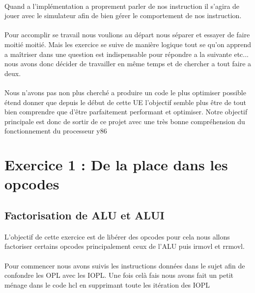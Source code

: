 \documentclass[12pt]{article}
\begin{document}
\paragraph{} Quand a l’implémentation a proprement parler de nos instruction il
s’agira de jouer avec le simulateur afin de bien gérer le comportement de nos instruction.

\paragraph{} Pour accomplir se travail nous voulions au départ nous séparer et essayer de faire moitié moitié. Mais les exercice se suive de manière logique tout se qu'on apprend a maîtriser dans une question est indispensable pour répondre a la suivante etc... nous avons donc décider de travailler en même temps et de chercher a tout faire a deux.

\paragraph{}Nous n'avons pas non plus cherché a produire un code le plus optimiser possible étend donner que depuis le début de cette UE l'objectif semble plus être de tout bien comprendre que d’être parfaitement performant et optimiser. Notre objectif principale est donc de sortir de ce projet avec une très bonne compréhension du fonctionnement du processeur y86

\newpage


\section{Exercice 1 : De la place dans les opcodes}
\subsection{Factorisation de ALU et ALUI}

\paragraph{}L'objectif de cette exercice est de libérer des opcodes pour cela nous allons factoriser certains opcodes principalement ceux de l'ALU puis irmovl et rrmovl.

\paragraph{}Pour commencer nous avons suivis les instructions données dans le sujet afin de confondre les OPL avec les IOPL. Une fois celà fais nous avons fait un petit ménage
dans le code hcl en supprimant toute les itération des IOPL
\end{document}
